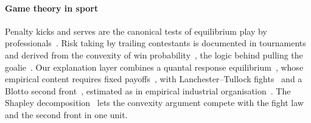\paragraph*{Game theory in sport}
Penalty kicks and serves are the canonical tests of equilibrium play by professionals~\cite{walker2001minimax,chiappori2002testing,palacios2003professionals}.
Risk taking by trailing contestants is documented in tournaments~\cite{genakos2012interim} and derived from the convexity of win probability~\cite{cabral2003rd,skinner2011scoring}, the logic behind pulling the goalie~\cite{beaudoin2010pulling}.
Our explanation layer combines a quantal response equilibrium~\cite{mckelvey1995quantal}, whose empirical content requires fixed payoffs~\cite{haile2008empirical}, with Lanchester--Tullock fights~\cite{lanchester1916aircraft,tullock1980efficient} and a Blotto second front~\cite{roberson2006colonel}, estimated as in empirical industrial organisation~\cite{aguirregabiria2007sequential}.
The Shapley decomposition~\cite{shapley1953value} lets the convexity argument compete with the fight law and the second front in one unit.
